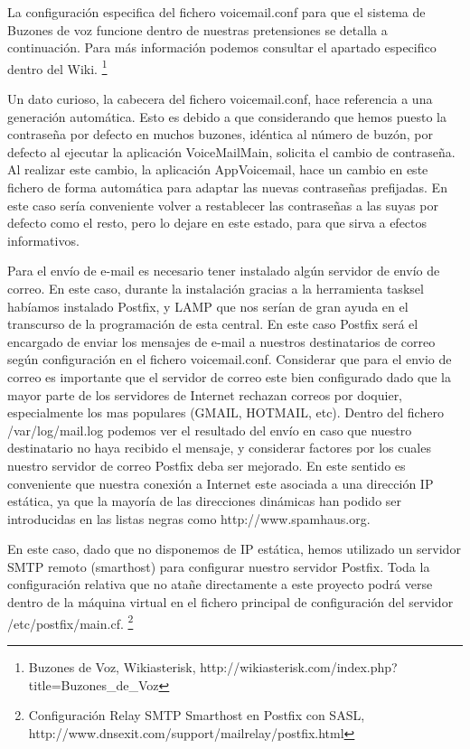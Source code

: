 La configuración especifica del fichero voicemail.conf para que el sistema de Buzones de voz funcione dentro de nuestras pretensiones se detalla a continuación. Para más información podemos consultar el apartado especifico dentro del Wiki. \footnote{Buzones de Voz, Wikiasterisk, http://wikiasterisk.com/index.php?title=Buzones\_de\_Voz}



Un dato curioso, la cabecera del fichero voicemail.conf, hace referencia a una generación automática. Esto es debido a que considerando que hemos puesto la contraseña por defecto en muchos buzones, idéntica al número de buzón, por defecto al ejecutar la aplicación VoiceMailMain, solicita el cambio de contraseña. Al realizar este cambio, la aplicación AppVoicemail, hace un cambio en este fichero de forma automática para adaptar las nuevas contraseñas prefijadas. En este caso sería conveniente volver a restablecer las contraseñas a las suyas por defecto como el resto, pero lo dejare en este estado, para que sirva a efectos informativos.

Para el envío de e-mail es necesario tener instalado algún servidor de envío de correo. En este caso, durante la instalación gracias a la herramienta tasksel habíamos instalado Postfix, y LAMP que nos serían de gran ayuda en el transcurso de la programación de esta central. En este caso Postfix será el encargado de enviar los mensajes de e-mail a nuestros destinatarios de correo según configuración en el fichero voicemail.conf. Considerar que para el envio de correo es importante que el servidor de correo este bien configurado dado que la mayor parte de los servidores de Internet rechazan correos por doquier, especialmente los mas populares (GMAIL, HOTMAIL, etc). Dentro del fichero /var/log/mail.log podemos ver el resultado del envío en caso que nuestro destinatario no haya recibido el mensaje, y considerar factores por los cuales nuestro servidor de correo Postfix deba ser mejorado. En este sentido es conveniente que nuestra conexión a Internet este asociada a una dirección IP estática, ya que la mayoría de las direcciones dinámicas han podido ser introducidas en las listas negras como http://www.spamhaus.org.

En este caso, dado que no disponemos de IP estática, hemos utilizado un servidor SMTP remoto (smarthost) para configurar nuestro servidor Postfix. Toda la configuración relativa que no atañe directamente a este proyecto podrá verse dentro de la máquina virtual en el fichero principal de configuración del servidor /etc/postfix/main.cf. \footnote{Configuración Relay SMTP Smarthost en Postfix con SASL, http://www.dnsexit.com/support/mailrelay/postfix.html}

